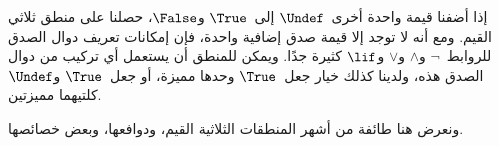 \documentclass[../../../include/open-logic-section]{subfiles}
\begin{document}


إذا أضفنا قيمة واحدة أخرى~$\Undef$ إلى~$\True$ و$\False$، حصلنا على
منطق ثلاثي القيم. ومع أنه لا توجد إلا قيمة صدق إضافية واحدة، فإن
إمكانات تعريف دوال الصدق للروابط~$\lnot$ و$\land$ و$\lor$ و$\lif$
كثيرة جدًا. ويمكن للمنطق أن يستعمل أي تركيب من دوال الصدق هذه، ولدينا
كذلك خيار جعل~$\True$ وحدها مميزة، أو جعل~$\True$ و$\Undef$ كلتيهما
مميزتين.

ونعرض هنا طائفة من أشهر المنطقات الثلاثية القيم، ودوافعها، وبعض
خصائصها.
\end{document}
